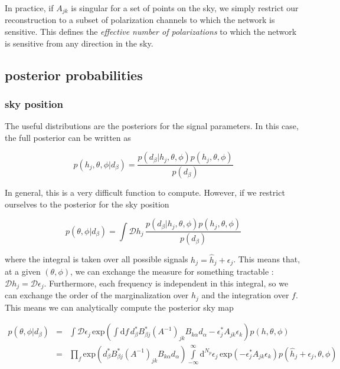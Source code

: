 \documentclass[10pt]{article}
\begin{document}
In practice, if $A_{jk}$ is singular for a set of points on the sky, we simply restrict our reconstruction to a subset of polarization channels to which the network is sensitive. This defines the \emph{effective number of polarizations} to which the network is sensitive from any direction in the sky.


\subsection{posterior probabilities}


\subsubsection{sky position}

The useful distributions are the posteriors for the signal parameters. In this case, the full posterior can be written as

\begin{equation}
p(h_j, \theta, \phi|d_\beta) = \frac{p(d_\beta|h_j, \theta, \phi)p(h_j, \theta, \phi)}{p(d_\beta)}
\end{equation}

In general, this is a very difficult function to compute. However, if we restrict ourselves to the posterior for the sky position

\begin{equation}
p(\theta, \phi|d_\beta) = \int\mathcal{D}h_j\, \frac{p(d_\beta|h_j, \theta, \phi)p(h_j, \theta, \phi)}{p(d_\beta)}
\end{equation}

where the integral is taken over all possible signals $h_j = \hat{h}_j +\epsilon_j$. This means that, at a given $(\theta, \phi)$, we can exchange the measure for something tractable : $\mathcal{D}h_j = \mathcal{D}\epsilon_j$. Furthermore, each frequency is independent in this integral, so we can exchange the order of the marginalization over $h_j$ and the integration over $f$. This means we can analytically compute the posterior sky map

\begin{eqnarray}
p(\theta, \phi|d_\beta) & = & \int\mathcal{D}\epsilon_j\, \mathrm{exp}\left( \int\mathrm{d}f\, d_\beta^\ast B_{\beta j}^\ast \left(A^{-1}\right)_{jk} B_{k\alpha} d_\alpha - \epsilon_j^\ast A_{jk} \epsilon_k \right) p(h, \theta, \phi) \\
 & = & \prod\limits_{f} \mathrm{exp}\left( d_\beta^\ast B_{\beta j}^\ast \left(A^{-1}\right)_{jk} B_{k\alpha} d_\alpha \right) \int\limits_{-\infty}^{\infty}\mathrm{d}^{N_p} \epsilon_j\, \mathrm{exp}\left(- \epsilon_j^\ast A_{jk} \epsilon_k \right) p(\hat{h}_j + \epsilon_j, \theta, \phi) 
\end{eqnarray}
\end{document}
